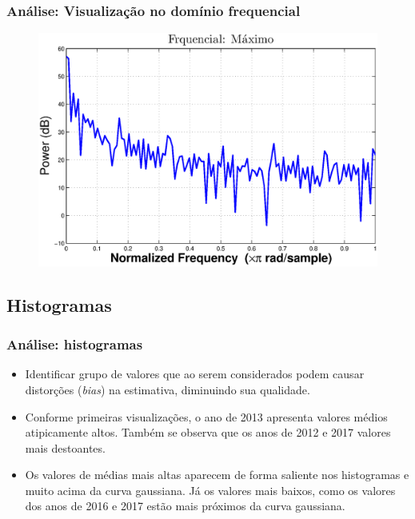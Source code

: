 \documentclass[xcolor=dvipsnames,xcolor=table]{beamer}
\begin{document}
\begin{frame}\frametitle{Análise: Visualização no domínio frequencial}
\begin{figure}[htpb] \begin{center} 
\includegraphics[width=0.9\columnwidth]{fq4}
\end{center}
\end{figure}
\end{frame}

\subsection{Histogramas}
\begin{frame}\frametitle{Análise: histogramas}

\begin{itemize}
\item Identificar grupo de valores que ao serem considerados podem causar distorções (\emph{bias}) na estimativa, diminuindo sua qualidade.
\item Conforme primeiras visualizações, o ano de 2013 apresenta valores médios atipicamente altos. Também se observa que os anos de 2012 e 2017 valores mais destoantes.
\item Os valores de médias mais altas aparecem de forma saliente nos histogramas e muito acima da curva gaussiana. Já os valores mais baixos, como os valores dos anos de 2016 e 2017 estão mais próximos da curva gaussiana. 
\end{itemize}

\end{frame}
\end{document}
